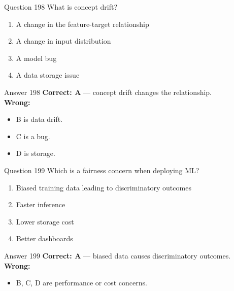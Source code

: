 \documentclass[aspectratio=169,11pt]{beamer}
\begin{document}
	\begin{frame}{Question 198}
		What is concept drift?
		\begin{enumerate}[label=\Alph*.]
			\item A change in the feature-target relationship
			\item A change in input distribution
			\item A model bug
			\item A data storage issue
		\end{enumerate}
	\end{frame}
	\begin{frame}{Answer 198}
		\textbf{Correct: A} --- concept drift changes the relationship.\\
		\vspace{0.5em}
		\textbf{Wrong:}
		\begin{itemize}
			\item B is data drift.
			\item C is a bug.
			\item D is storage.
		\end{itemize}
	\end{frame}
	
	\begin{frame}{Question 199}
		Which is a fairness concern when deploying ML?
		\begin{enumerate}[label=\Alph*.]
			\item Biased training data leading to discriminatory outcomes
			\item Faster inference
			\item Lower storage cost
			\item Better dashboards
		\end{enumerate}
	\end{frame}
	\begin{frame}{Answer 199}
		\textbf{Correct: A} --- biased data causes discriminatory outcomes.\\
		\vspace{0.5em}
		\textbf{Wrong:}
		\begin{itemize}
			\item B, C, D are performance or cost concerns.
		\end{itemize}
	\end{frame}
	
\end{document}
